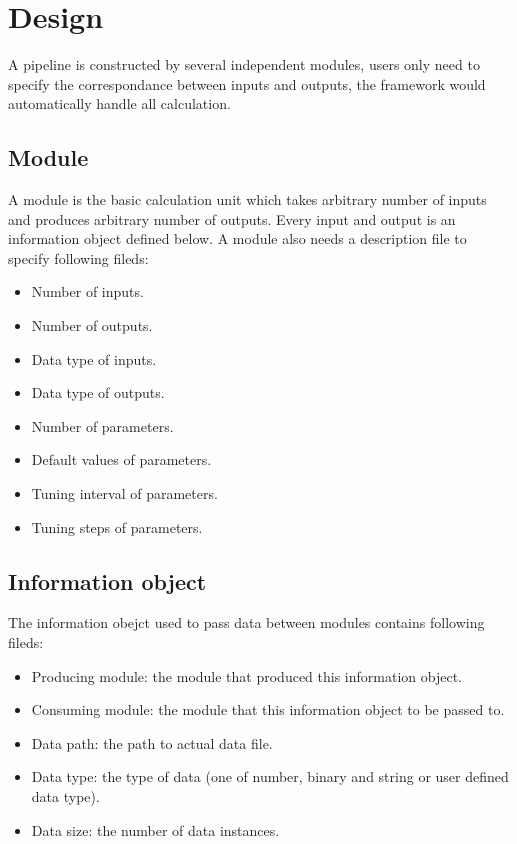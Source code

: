 \documentclass{article}
\begin{document}
\section{Design}
    A pipeline is constructed by several independent modules,
    users only need to specify the correspondance between inputs and outputs,
    the framework would automatically handle all calculation.

    \subsection{Module}
    A module is the basic calculation unit which takes arbitrary number of inputs and produces arbitrary number of outputs.
    Every input and output is an information object defined below.
    A module also needs a description file to specify following fileds:
    \begin{itemize}
        \item Number of inputs.
        \item Number of outputs.
        \item Data type of inputs.
        \item Data type of outputs.
        \item Number of parameters.
        \item Default values of parameters.
        \item Tuning interval of parameters.
        \item Tuning steps of parameters.
    \end{itemize}

    \subsection{Information object}
    The information obejct used to pass data between modules contains following fileds:

    \begin{itemize}
        \item Producing module: the module that produced this information object.
        \item Consuming module: the module that this information object to be passed to.
        \item Data path: the path to actual data file.
        \item Data type: the type of data (one of number, binary and string or user defined data type).
        \item Data size: the number of data instances.
    \end{itemize}
\end{document}
